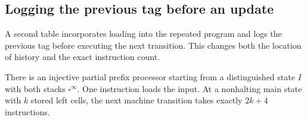 \subsection{Logging the previous tag before an update}
\label{subsec:sb-prelog}
A second table incorporates loading into the repeated program and logs the previous tag before executing the next transition.  This changes both the location of history and the exact instruction count.

\begin{lemma}\label{lem:sb-prelog}
There is an injective partial prefix processor starting from a distinguished state $I$ with both stacks $\square^\infty$.  One instruction loads the input.  At a nonhalting main state with $k$ stored left cells, the next machine transition takes exactly $2k+4$ instructions.
\end{lemma}

